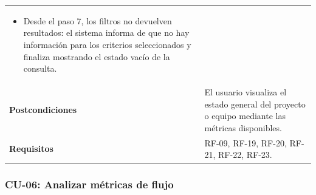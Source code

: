 {\begin{longtable}{p{3.2cm}p{10.2cm}}
\begin{minipage}[t]{10.2cm}
\begin{itemize}[noitemsep,leftmargin=*]
    \item Desde el paso 7, los filtros no devuelven resultados: el sistema informa de que no hay información para los criterios seleccionados y finaliza mostrando el estado vacío de la consulta.
\end{itemize}\end{minipage} \\
\textbf{Postcondiciones} & El usuario visualiza el estado general del proyecto o equipo mediante las métricas disponibles. \\
\textbf{Requisitos} & RF-09, RF-19, RF-20, RF-21, RF-22, RF-23. \\
\bottomrule
\end{longtable}
\vspace{0.45em}
}

\clearpage
\subsubsection{CU-06: Analizar métricas de flujo}

